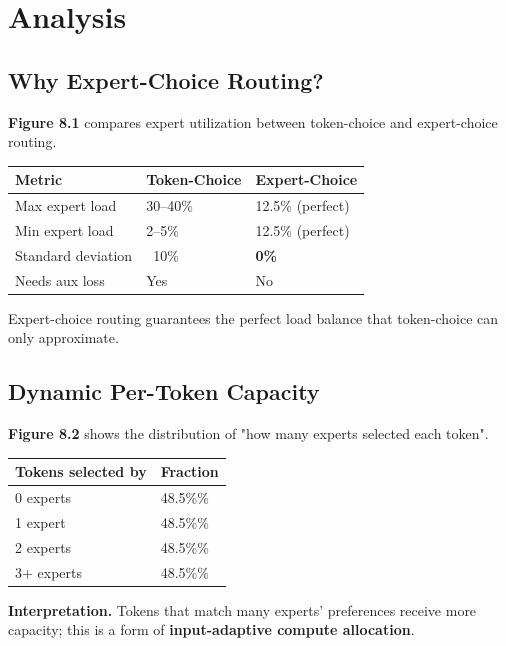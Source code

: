 \section{Analysis}

\subsection{Why Expert-Choice Routing?}

\textbf{Figure 8.1} compares expert utilization between token-choice and 
expert-choice routing.

\begin{table}[H]
\centering
\small
\begin{tabular}{lll}
\toprule
\textbf{Metric} & \textbf{Token-Choice} & \textbf{Expert-Choice} \\
\midrule
Max expert load & 30--40\% & 12.5\% (perfect) \\
Min expert load & 2--5\% & 12.5\% (perfect) \\
Standard deviation & ~10\% & \textbf{0\%} \\
Needs aux loss & Yes & No \\
\bottomrule
\end{tabular}
\end{table}

Expert-choice routing guarantees the perfect load balance that token-choice 
can only approximate.

\subsection{Dynamic Per-Token Capacity}

\textbf{Figure 8.2} shows the distribution of "how many experts selected each 
token".

\begin{table}[H]
\centering
\small
\begin{tabular}{ll}
\toprule
\textbf{Tokens selected by} & \textbf{Fraction} \\
\midrule
0 experts & 48.5\%\% \\
1 expert & 48.5\%\% \\
2 experts & 48.5\%\% \\
3+ experts & 48.5\%\% \\
\bottomrule
\end{tabular}
\end{table}

\textbf{Interpretation.} Tokens that match many experts' preferences receive 
more capacity; this is a form of \textbf{input-adaptive compute allocation}.

